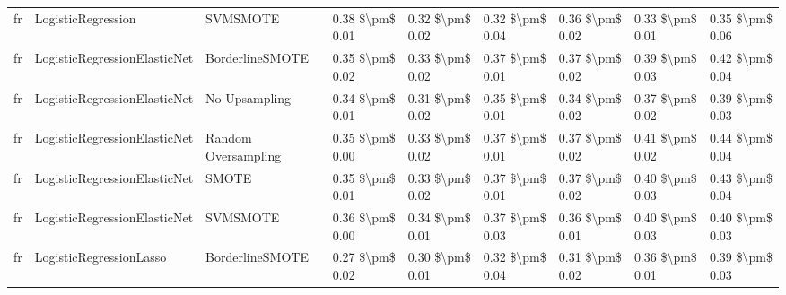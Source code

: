\begin{tabular}{lllllllll}
      fr &              LogisticRegression &                      SVMSMOTE & 0.38 \$\textbackslash pm\$ 0.01 &           0.32 \$\textbackslash pm\$ 0.02 &       0.32 \$\textbackslash pm\$ 0.04 &        0.36 \$\textbackslash pm\$ 0.02 &                         0.33 \$\textbackslash pm\$ 0.01 &     0.35 \$\textbackslash pm\$ 0.06 \\
      fr &    LogisticRegressionElasticNet &               BorderlineSMOTE & 0.35 \$\textbackslash pm\$ 0.02 &           0.33 \$\textbackslash pm\$ 0.02 &       0.37 \$\textbackslash pm\$ 0.01 &        0.37 \$\textbackslash pm\$ 0.02 &                         0.39 \$\textbackslash pm\$ 0.03 &     0.42 \$\textbackslash pm\$ 0.04 \\
      fr &    LogisticRegressionElasticNet &                 No Upsampling & 0.34 \$\textbackslash pm\$ 0.01 &           0.31 \$\textbackslash pm\$ 0.02 &       0.35 \$\textbackslash pm\$ 0.01 &        0.34 \$\textbackslash pm\$ 0.02 &                         0.37 \$\textbackslash pm\$ 0.02 &     0.39 \$\textbackslash pm\$ 0.03 \\
      fr &    LogisticRegressionElasticNet &           Random Oversampling & 0.35 \$\textbackslash pm\$ 0.00 &           0.33 \$\textbackslash pm\$ 0.02 &       0.37 \$\textbackslash pm\$ 0.01 &        0.37 \$\textbackslash pm\$ 0.02 &                         0.41 \$\textbackslash pm\$ 0.02 &     0.44 \$\textbackslash pm\$ 0.04 \\
      fr &    LogisticRegressionElasticNet &                         SMOTE & 0.35 \$\textbackslash pm\$ 0.01 &           0.33 \$\textbackslash pm\$ 0.02 &       0.37 \$\textbackslash pm\$ 0.01 &        0.37 \$\textbackslash pm\$ 0.02 &                         0.40 \$\textbackslash pm\$ 0.03 &     0.43 \$\textbackslash pm\$ 0.04 \\
      fr &    LogisticRegressionElasticNet &                      SVMSMOTE & 0.36 \$\textbackslash pm\$ 0.00 &           0.34 \$\textbackslash pm\$ 0.01 &       0.37 \$\textbackslash pm\$ 0.03 &        0.36 \$\textbackslash pm\$ 0.01 &                         0.40 \$\textbackslash pm\$ 0.03 &     0.40 \$\textbackslash pm\$ 0.03 \\
      fr &         LogisticRegressionLasso &               BorderlineSMOTE & 0.27 \$\textbackslash pm\$ 0.02 &           0.30 \$\textbackslash pm\$ 0.01 &       0.32 \$\textbackslash pm\$ 0.04 &        0.31 \$\textbackslash pm\$ 0.02 &                         0.36 \$\textbackslash pm\$ 0.01 &     0.39 \$\textbackslash pm\$ 0.03 \\

\end{tabular}
